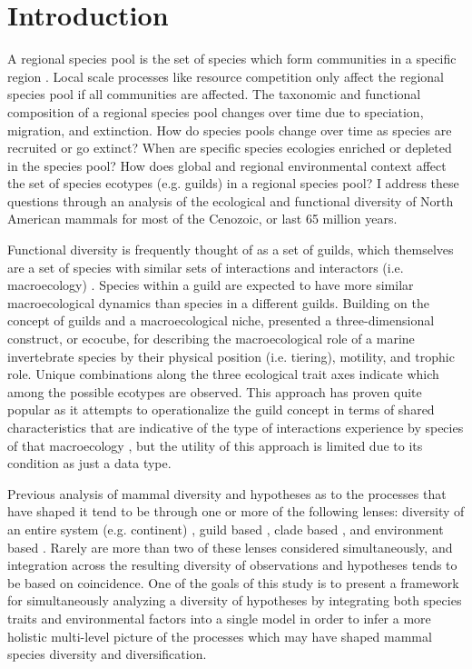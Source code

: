 \documentclass[12pt,letterpaper]{article}
\begin{document}
\section*{Introduction}
A regional species pool is the set of species which form communities in a specific region \citep{Mittelbach2015a,Harrison2008}. Local scale processes like resource competition only affect the regional species pool if all communities are affected. The taxonomic and functional composition of a regional species pool changes over time due to speciation, migration, and extinction. How do species pools change over time as species are recruited or go extinct? When are specific species ecologies enriched or depleted in the species pool? How does global and regional environmental context affect the set of species ecotypes (e.g. guilds) in a regional species pool? I address these questions through an analysis of the ecological and functional diversity of North American mammals for most of the Cenozoic, or last 65 million years.

Functional diversity is frequently thought of as a set of guilds, which themselves are a set of species with similar sets of interactions and interactors (i.e. macroecology) \citep{Valentine1969,Bambach1977,Brown1989,Simberloff1991a,Wilson1999}. Species within a guild are expected to have more similar macroecological dynamics than species in a different guilds. Building on the concept of guilds and a macroecological niche, \citet{Bush2007} presented a three-dimensional construct, or ecocube, for describing the macroecological role of a marine invertebrate species by their physical position (i.e. tiering), motility, and trophic role. Unique combinations along the three ecological trait axes indicate which among the possible ecotypes are observed. This approach has proven quite popular as it attempts to operationalize the guild concept in terms of shared characteristics that are indicative of the type of interactions experience by species of that macroecology \citep{Bush2007,Bambach2007,Bush2011,Bush2012b,Novack-Gottshall2007,Villeger2011}, but the utility of this approach is limited due to its condition as just a data type.

Previous analysis of mammal diversity and hypotheses as to the processes that have shaped it tend to be through one or more of the following lenses: diversity of an entire system (e.g. continent) \citep{Alroy2000g,Alroy1996a,Figueirido2012,Liow2008}, guild based \citep{Janis2004,Janis2000,Jernvall2004,Janis1993c,Pires2015a,Janis2008a}, clade based \citep{Quental2013,Slater2015c,Silvestro2015b,Fraser2015a,Cantalapiedra2017}, and environment based \citep{Blois2009,Janis1993c,Janis1993b,Fraser2015a,Eronen2015,Badgley2013,Badgley2017}. Rarely are more than two of these lenses considered simultaneously, and integration across the resulting diversity of observations and hypotheses tends to be based on coincidence. One of the goals of this study is to present a framework for simultaneously analyzing a diversity of hypotheses by integrating both species traits and environmental factors into a single model in order to infer a more holistic multi-level picture of the processes which may have shaped mammal species diversity and diversification.
\end{document}
